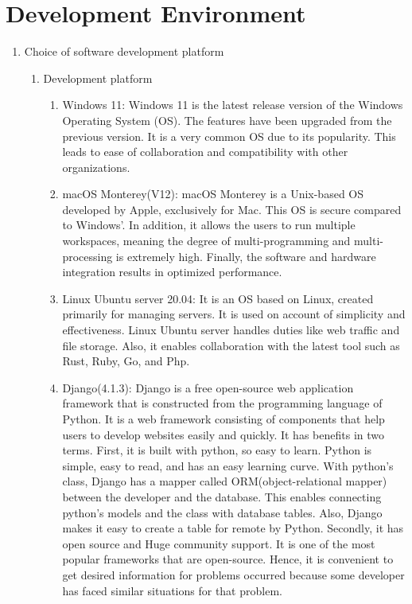 \documentclass[conference]{IEEEtran}
\begin{document}
\section{\Large{Development Environment}}
\begin{enumerate}[label=\arabic*.]
    \item {\large{Choice of software development platform}} \\
    \begin{enumerate}[label=\alph*.]
        \item {\large{Development platform}} \\
        \begin{enumerate}[label=\roman*.]
            \item {\large{Windows 11: Windows 11 is the latest release version of the Windows Operating System (OS). The features have been upgraded from the previous version. It is a very common OS due to its popularity. This leads to ease of collaboration and compatibility with other organizations. }} \\
            \item {\large{macOS Monterey(V12): macOS Monterey is a Unix-based OS developed by Apple, exclusively for Mac. This OS is secure compared to Windows’. In addition, it allows the users to run multiple workspaces, meaning the degree of multi-programming and multi-processing is extremely high. Finally, the software and hardware integration results in optimized performance. }} \\
            \item {\large{Linux Ubuntu server 20.04:  It is an OS based on Linux, created primarily for managing servers. It is used on account of simplicity and effectiveness. Linux Ubuntu server handles duties like web traffic and file storage. Also, it enables collaboration with the latest tool such as Rust, Ruby, Go, and Php. }} \\
            \item {\large{Django(4.1.3): Django is a free open-source web application framework that is constructed from the programming language of Python. It is a web framework consisting of components that help users to develop websites easily and quickly. It has benefits in two terms. First, it is built with python, so easy to learn. Python is simple, easy to read, and has an easy learning curve. With python’s class, Django has a mapper called ORM(object-relational mapper) between the developer and the database. This enables connecting python’s models and the class with database tables. Also, Django makes it easy to create a table for remote by Python. Secondly, it has open source and Huge community support. It is one of the most popular frameworks that are open-source. Hence, it is convenient to get desired information for problems occurred because some developer has faced similar situations for that problem. }} \\       

\end{enumerate}
\end{enumerate}
\end{enumerate}
\end{document}
